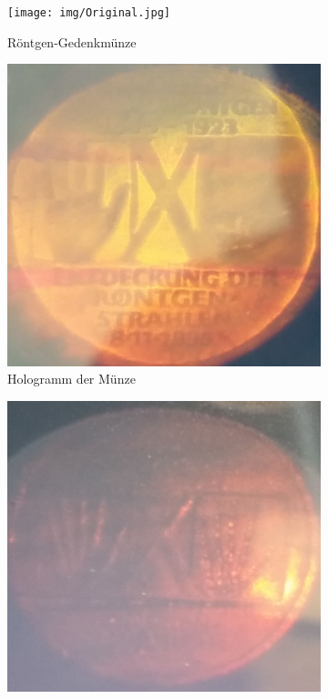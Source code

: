 \documentclass[bigchapter,colorback,accentcolor=tud4b,linedtoc,11pt]{tudreport}
\begin{document}
\begin{figure}[H]
  \centering
  \begin{subfigure}[h]{0.3\textwidth}
    \texttt{[image: img/Original.jpg]}
    \caption{Röntgen-Gedenkmünze}
    \label{fig:gedenkmuenze}
  \end{subfigure}%
  \quad%
  \begin{subfigure}[h]{0.3\textwidth}
    \includegraphics[width=\textwidth]{img/Hologramm-1-Tageslicht.jpg}
    \caption{Hologramm der Münze}
    \label{fig:gedenkholo}
  \end{subfigure}
  \quad%
  \begin{subfigure}[h]{0.3\textwidth}
    \includegraphics[width=\textwidth]{img/Hologramm-2-Kopie}

\end{subfigure}
\end{figure}
\end{document}
